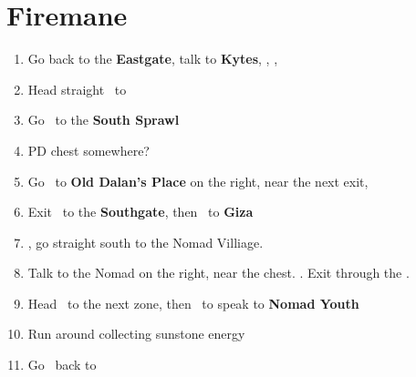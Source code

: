 \chapter{Firemane}
\begin{enumerate}
	\item Go back to the \textbf{Eastgate}, talk to \textbf{Kytes}, \cs, \cs, \cs
	\item Head straight \east\ to \lowtown
	\item Go \south\ to the \textbf{South Sprawl}
	\item PD chest somewhere?
	\item Go \south\ to \textbf{Old Dalan's Place} on the right, near the next exit, \cs
	\item Exit \south\ to the \textbf{Southgate}, then \south\ to \textbf{Giza}
	\item \cs, go straight south to the Nomad Villiage.
	\item Talk to the Nomad on the right, near the chest. \cs. Exit through the \south\west.
	\item Head \south\ to the next zone, then \east\ to speak to \textbf{Nomad Youth}
	\item Run around collecting sunstone energy
	\item Go \north\ back to \rabanastre
\end{enumerate}

